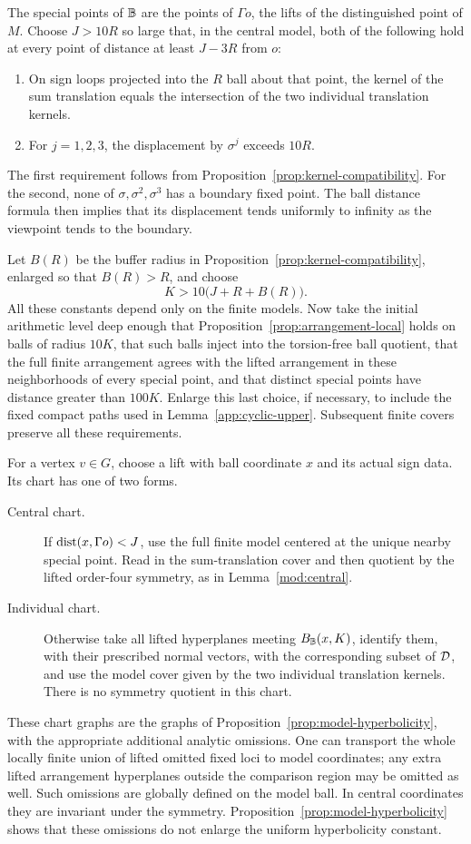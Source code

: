 The special points of $\mathbb B$ are the points of $\Gamma o$, the lifts
of the distinguished point of $M$.  Choose $J>10R$ so large that, in
the central model, both of the following hold at every point of
distance at least $J-3R$ from $o$:
\begin{enumerate}
\item On sign loops projected into the $R$ ball about that point, the
kernel of the sum translation equals the intersection of the two
individual translation kernels.
\item For $j=1,2,3$, the displacement by $\sigma^j$ exceeds $10R$.
\end{enumerate}
The first requirement follows from
Proposition~\ref{prop:kernel-compatibility}.  For the second, none of
$\sigma,\sigma^2,\sigma^3$ has a boundary fixed point.  The ball
distance formula then implies that its displacement tends uniformly
to infinity as the viewpoint tends to the boundary.

Let $B(R)$ be the buffer radius in
Proposition~\ref{prop:kernel-compatibility}, enlarged so that
$B(R)>R$, and choose
\begin{equation}\label{app:chart-radius}
 K>10\bigl(J+R+B(R)\bigr).
\end{equation}
All these constants depend only on the finite models.  Now take the
initial arithmetic level deep enough that
Proposition~\ref{prop:arrangement-local} holds on balls of radius
$10K$, that such balls inject into the torsion-free ball quotient,
that the full finite arrangement agrees with the lifted arrangement
in these neighborhoods of every special point, and that distinct
special points have distance greater than $100K$.  Enlarge this last
choice, if necessary, to include the fixed compact paths used in
Lemma~\ref{app:cyclic-upper}.  Subsequent finite covers preserve all
these requirements.

For a vertex $v\in G$, choose a lift with ball coordinate $x$ and its
actual sign data.  Its chart has one of two forms.
\begin{description}
\item[Central chart.] If $\operatorname{dist}(x,\Gamma o)<J$, use the full finite
model centered at the unique nearby special point.  Read in the
sum-translation cover and then quotient by the lifted order-four
symmetry, as in Lemma~\ref{mod:central}.
\item[Individual chart.] Otherwise take all lifted hyperplanes
meeting $B_{\mathbb B}(x,K)$, identify them, with their prescribed normal
vectors, with the corresponding subset of $\mathcal D$, and use the model
cover given by the two individual translation kernels.  There is no
symmetry quotient in this chart.
\end{description}
These chart graphs are the graphs of
Proposition~\ref{prop:model-hyperbolicity}, with the appropriate
additional analytic omissions.  One can transport the whole locally
finite union of lifted omitted fixed loci to model coordinates; any
extra lifted arrangement hyperplanes outside the comparison region
may be omitted as well.  Such omissions are globally defined on the
model ball.  In central coordinates they are invariant under the
symmetry.  Proposition~\ref{prop:model-hyperbolicity} shows that these
omissions do not enlarge the uniform hyperbolicity constant.

